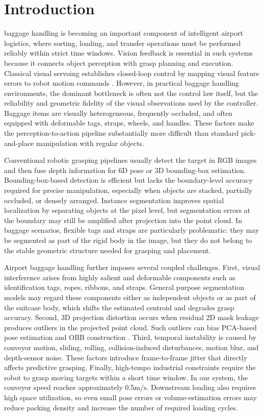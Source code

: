 \section{Introduction}
 baggage handling is becoming an important component of intelligent airport logistics, where sorting, loading, and transfer operations must be performed reliably within strict time windows. Vision feedback is essential in such systems because it connects object perception with grasp planning and execution. Classical visual servoing establishes closed-loop control by mapping visual feature errors to robot motion commands \cite{hutchinson2002tutorial}. However, in practical baggage handling environments, the dominant bottleneck is often not the control law itself, but the reliability and geometric fidelity of the visual observations used by the controller. Baggage items are visually heterogeneous, frequently occluded, and often equipped with deformable tags, straps, wheels, and handles. These factors make the perception-to-action pipeline substantially more difficult than standard pick-and-place manipulation with regular objects.

Conventional robotic grasping pipelines usually detect the target in RGB images and then fuse depth information for 6D pose or 3D bounding-box estimation. Bounding-box-based detection is efficient but lacks the boundary-level accuracy required for precise manipulation, especially when objects are stacked, partially occluded, or densely arranged. Instance segmentation improves spatial localization by separating objects at the pixel level, but segmentation errors at the boundary may still be amplified after projection into the point cloud. In baggage scenarios, flexible tags and straps are particularly problematic: they may be segmented as part of the rigid body in the image, but they do not belong to the stable geometric structure needed for grasping and placement.

Airport baggage handling further imposes several coupled challenges. First, visual interference arises from highly salient and deformable components such as identification tags, ropes, ribbons, and straps. General purpose segmentation models \cite{he2017mask} may regard these components either as independent objects or as part of the suitcase body, which shifts the estimated centroid and degrades grasp accuracy. Second, 3D projection distortion occurs when residual 2D mask leakage produces outliers in the projected point cloud. Such outliers can bias PCA-based pose estimation and OBB construction \cite{rusu20113d, gottschalk1996obbtree}. Third, temporal instability is caused by conveyor motion, sliding, rolling, collision-induced disturbances, motion blur, and depth-sensor noise. These factors introduce frame-to-frame jitter that directly affects predictive grasping. Finally, high-tempo industrial constraints require the robot to grasp moving targets within a short time window. In our system, the conveyor speed reaches approximately 0.5$\mathrm{m/s}$. Downstream loading also requires high space utilization, so even small pose errors or volume-estimation errors may reduce packing density and increase the number of required loading cycles.

